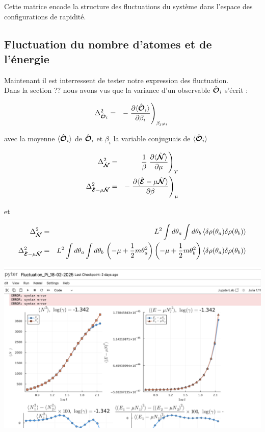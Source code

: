 Cette matrice encode la structure des fluctuations du système dans l’espace des configurations de rapidité.



\subsection{Fluctuation du nombre d'atomes et de l'énergie}

Maintenant il est interressent de tester notre expression des fluctuation.\\
Dans la section {??} nous avons vus que la variance d'un observable $\hat{\bm{\mathcal{O}}}_i$ s'écrit :

\begin{eqnarray*}
	\Delta_{\operator{\mathcal{O}}_i}^2 & = & -  \left . \frac{ \partial \langle \operator{\mathcal{O}}_i \rangle }{ \partial \beta_i } 	 \right )_{\beta_{j \neq i } }
\end{eqnarray*}

avec la moyenne $\langle \hat{\bm{\mathcal{O}}}_i \rangle $ de  $\hat{\bm{\mathcal{O}}}_i$ et $\beta_i$ la variable conjuguais de $\langle \hat{\bm{\mathcal{O}}}_i \rangle $ 
 

\begin{eqnarray*}
	\Delta_{\hat{\bm{\mathcal{N}}}}^2  & = &  \frac{1}{\beta} \left . \frac{\partial \langle \hat{\bm{\mathcal{N}}} \rangle}{\partial \mu} \right )_T \\
	\Delta_{\hat{\bm{\mathcal{E}}}-\mu \hat{\bm{\mathcal{N}}}}^2  & = &  - \left . \frac{\partial \langle \hat{\bm{\mathcal{E}}}-\mu \hat{\bm{\mathcal{N}}} \rangle}{\partial \beta} \right )_\mu 
\end{eqnarray*}

et 

\begin{eqnarray*}
	\Delta_{\hat{\bm{\mathcal{N}}}}^2  &= & L^2 \int d\theta_a \int d \theta_b \, \langle \delta \rho(\theta_a) \delta \rho(\theta_b) \rangle \\
	\Delta_{\hat{\bm{\mathcal{E}}}-\mu \hat{\bm{\mathcal{N}}}}^2  & = & L^2 \int d\theta_a \int d \theta_b \, \left ( - \mu + \frac{1}2 m \theta_a^2  \right  )\left ( - \mu + \frac{1}2 m \theta_b^2  \right  )  \langle \delta \rho(\theta_a) \delta \rho(\theta_b) \rangle
\end{eqnarray*}

\includegraphics[width=1\textwidth]{Figures/test}

